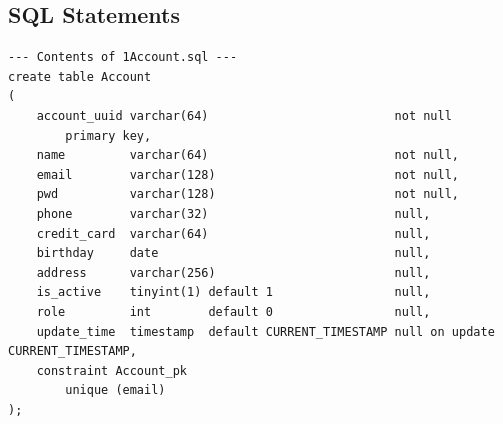 \documentclass[a4paper, 12pt]{article}
\begin{document}
\subsection{SQL Statements}
\tiny
\begin{lstlisting}
--- Contents of 1Account.sql ---
create table Account
(
    account_uuid varchar(64)                          not null
        primary key,
    name         varchar(64)                          not null,
    email        varchar(128)                         not null,
    pwd          varchar(128)                         not null,
    phone        varchar(32)                          null,
    credit_card  varchar(64)                          null,
    birthday     date                                 null,
    address      varchar(256)                         null,
    is_active    tinyint(1) default 1                 null,
    role         int        default 0                 null,
    update_time  timestamp  default CURRENT_TIMESTAMP null on update CURRENT_TIMESTAMP,
    constraint Account_pk
        unique (email)
);


\end{lstlisting}
\end{document}
